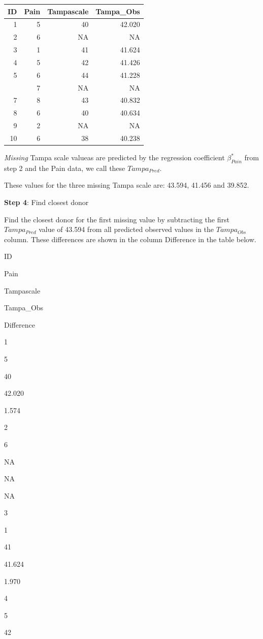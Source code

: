 \documentclass[
]{book}
\begin{document}
\begin{tabular}{rrrr}
\toprule
ID & Pain & Tampascale & Tampa\_Obs\\
\midrule
1 & 5 & 40 & 42.020\\
2 & 6 & NA & NA\\
3 & 1 & 41 & 41.624\\
4 & 5 & 42 & 41.426\\
5 & 6 & 44 & 41.228\\
\addlinespace
6 & 7 & NA & NA\\
7 & 8 & 43 & 40.832\\
8 & 6 & 40 & 40.634\\
9 & 2 & NA & NA\\
10 & 6 & 38 & 40.238\\
\bottomrule
\end{tabular}

\emph{Missing} Tampa scale valueas are predicted by the regression coefficient \(\beta_{Pain}^*\) from step 2 and the Pain data, we call these \(Tampa_{Pred}\).

These values for the three missing Tampa scale are: 43.594, 41.456 and 39.852.

\textbf{Step 4}: Find closest donor

Find the closest donor for the first missing value by subtracting the first \(Tampa_{Pred}\) value of 43.594 from all predicted observed values in the \(Tampa_{Obs}\) column. These differences are shown in the column Difference in the table below.

ID

Pain

Tampascale

Tampa\_Obs

Difference

1

5

40

42.020

1.574

2

6

NA

NA

NA

3

1

41

41.624

1.970

4

5

42
\end{document}
